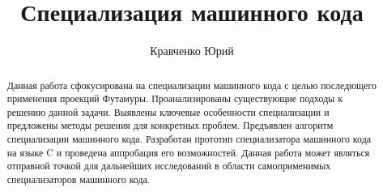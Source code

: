 
\lstset{escapechar=@,style=mycode}


\title{Специализация машинного кода}


\author{Кравченко Юрий}



\maketitle

\begin{abstract}
Данная работа сфокусирована на специализации машинного кода с целью последющего применения проекций Футамуры. Проанализированы существующие подходы к решению данной задачи. Выявлены ключевые особенности специализации и предложены методы решения для конкретных проблем. Предъявлен алгоритм специализации машинного кода. Разработан прототип специализатора машинного кода на языке C и проведена аппробация его возможностей. Данная работа может являться отправной точкой для дальнейших исследований в области самоприменимых специализаторов машинного кода.

\end{abstract}


